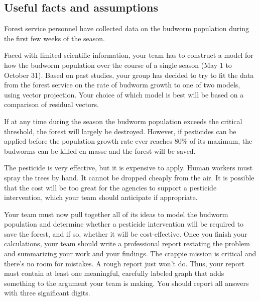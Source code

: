 \documentclass{article}
\begin{document}
\subsection*{Useful facts and assumptions}
\vspace{-2.8ex}

    \begin{compactitem}

        \item Forest service personnel have collected data on the budworm
        population during the first few weeks of the season.

        \item Faced with limited scientific information,
        your team has to construct a model for how the budworm population over
        the course of a single season (May 1 to October 31). Based on past
        studies, your group has decided to try to fit the data from the forest
        service on the rate of budworm growth to one of two models,
        using vector projection. Your choice of which model is best will be
        based on a comparison of residual vectors.

        \item If at any time during the season the budworm population exceeds
        the critical threshold, the forest will largely be destroyed. However,
        if pesticides can be applied before the population growth rate ever
        reaches 80\% of its maximum, the budworms can be killed en masse and
        the forest will be saved.

        \item The pesticide is very effective, but it is expensive to apply.
        Human workers must spray the trees by hand. It cannot be dropped
        cheaply from the air. It is possible that the cost will be too great
        for the agencies to support a pesticide intervention, which your team
        should anticipate if appropriate.

    \end{compactitem}

\newpage

    Your team must now pull together all of its ideas to model the budworm
    population and determine whether a pesticide intervention will be required
    to save the forest, and if so, whether it will be cost-effective. Once you
    finish your calculations, your team should write a professional report
    restating the problem and summarizing your work and your findings. The
    crappie mission is critical and there's no room for mistakes. A rough
    report just won't do. Thus, your report must contain at least one
    meaningful, carefully labeled graph that adds something to the argument
    your team is making. You should report all answers with three significant
    digits.
\end{document}
